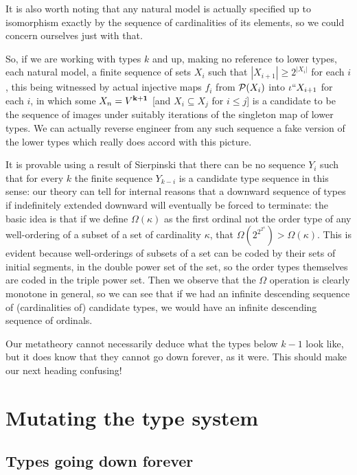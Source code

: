 \documentclass[12pt]{article}
\begin{document}
It is also worth noting that any natural model is actually specified up to isomorphism exactly by the sequence of cardinalities of its elements, so we could concern ourselves just with that.

So, if we are working with types $k$ and up, making no reference to lower types, each natural model, a finite sequence of sets
$X_i$ such that $|X_{i+1}| \geq 2^{|X_i|}$ for each $i$, this being witnessed by actual injective maps $f_i$ from ${\cal P}(X_i)$ into $\iota``X_{i+1}$ for each $i$, in which some
$X_n = V^{\bf k+1}$ [and $X_i \subseteq X_j$ for $i \leq j$] is a candidate to be the sequence of images under suitably iterations of the singleton map of lower types.  We can actually reverse engineer from any such sequence a fake version of the lower types which really does accord with this picture.

It is provable using a result of Sierpinski that there can be no sequence $Y_i$ such that for every $k$ the finite sequence $Y_{k-i}$ is a candidate type sequence in this sense:
our theory can tell for internal reasons that a downward sequence of types if indefinitely extended downward will eventually be forced to terminate:  the basic idea is that
if we define $\Omega(\kappa)$ as the first ordinal not the order type of any well-ordering of a subset of a set of cardinality $\kappa$, that $\Omega(2^{2^{2^\kappa}})>\Omega(\kappa)$.
This is evident because well-orderings of subsets of a set can be coded by their sets of initial segments, in the double power set of the set, so the order types themselves are coded in the triple power set.  Then we observe that the $\Omega$ operation  is clearly monotone in general, so we can see that if we had an infinite descending sequence of (cardinalities of) candidate types, we would have an infinite descending sequence of ordinals.

Our metatheory cannot necessarily deduce what the types below $k-1$ look like, but it does know that they cannot go down forever, as it were.  This should make our next heading confusing!

\section{Mutating the type system}

\subsection{Types going down forever}
\end{document}

